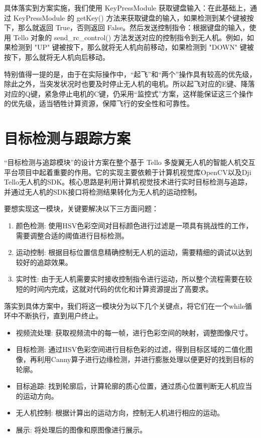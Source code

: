 \documentclass[report, twoside, UTF8, AutoFakeBold = 1, AutoFakeSlant, zihao = -4]{config}
\begin{document}
具体落实到方案实施，我们使用 KeyPressModule 获取键盘输入：在此基础上，通过 KeyPressModule 的 getKey() 方法来获取键盘的输入，如果检测到某个键被按下，那么就返回 True，否则返回 False。然后发送控制指令：根据键盘的输入，使用 Tello 对象的 send\_rc\_control() 方法发送对应的控制指令到无人机。例如，如果检测到 "UP" 键被按下，那么就将无人机向前移动，如果检测到 "DOWN" 键被按下，那么就将无人机向后移动。

特别值得一提的是，由于在实际操作中，“起飞”和“两个”操作具有较高的优先级，除此之外，当突发状况时也要及时停止无人机的电机。所以起飞对应的E键、降落对应的Q键，紧急停止电机的C键，仍采用“监控式”方案，这样能保证这三个操作的优先级，适当牺牲计算资源，保障飞行的安全性和可靠性。

\section{目标检测与跟踪方案}
“目标检测与追踪模块”的设计方案在整个基于 Tello 多旋翼无人机的智能人机交互平台项目中起着重要的作用。它的实现主要依赖于计算机视觉库OpenCV以及Dji Tello无人机的SDK。核心思路是利用计算机视觉技术进行实时目标检测与追踪，并通过无人机的SDK接口将检测结果转化为无人机的运动控制。

要想实现这一模块，关键要解决以下三方面问题：
\begin{enumerate}
    \item 颜色检测: 使用HSV色彩空间对目标颜色进行过滤是一项具有挑战性的工作，需要调整合适的阈值进行目标检测。
    \item 运动控制: 根据目标位置信息精确控制无人机的运动，需要精细的调试以达到较好的追踪效果。
    \item 实时性: 由于无人机需要实时接收控制指令进行运动，所以整个流程需要在较短的时间内完成，这就对代码的优化和计算资源提出了高要求。
\end{enumerate}

落实到具体方案中，我们将这一模块分为以下几个关键点，将它们在一个while循环中不断执行，直到用户终止。

\begin{itemize}
    \item 视频流处理: 获取视频流中的每一帧，进行色彩空间的映射，调整图像尺寸。
    \item 目标检测: 通过HSV色彩空间进行目标色彩的过滤，得到目标区域的二值化图像，再利用Canny算子进行边缘检测，并进行膨胀处理以便更好的找到目标的轮廓。
    \item 目标追踪: 找到轮廓后，计算轮廓的质心位置，通过质心位置判断无人机应当的运动方向。
    \item 无人机控制: 根据计算出的运动方向，控制无人机进行相应的运动。
    \item 展示: 将处理后的图像和原图像进行展示。
\end{itemize}
\end{document}

